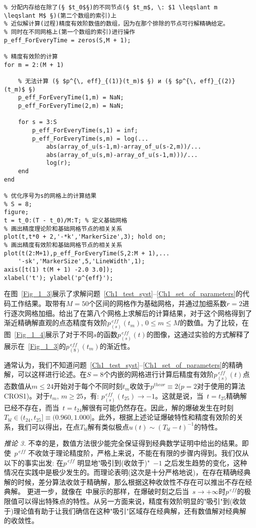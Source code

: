 \documentclass[twoside]{book}
\begin{document}
\begin{CJK*}{GBK}{song}
\begin{lstlisting}
% 分配内存给在除了(§ $t_0$§)的不同节点(§ $t_m$, \: $1 \leqslant m \leqslant M$ §)(第二个数组的索引)上
% 近似解计算(过程)精度有效阶数值的数组，因为在那个排除的节点可行解精确给定。
% 同时在不同网格上(第一个数组的索引)进行操作
p_eff_ForEveryTime = zeros(S,M + 1);

% 精度有效阶的计算
for m = 2:(M + 1)

    % 无法计算 (§ $p^{\, eff}_{(1)}(t_m)$ §) и (§ $p^{\, eff}_{(2)}(t_m)$ §)
    p_eff_ForEveryTime(1,m) = NaN;
    p_eff_ForEveryTime(2,m) = NaN;

    for s = 3:S
        p_eff_ForEveryTime(s,1) = inf;
        p_eff_ForEveryTime(s,m) = log(...
            abs(array_of_u(s-1,m)-array_of_u(s-2,m))/...
            abs(array_of_u(s,m)-array_of_u(s-1,m)))/...
            log(r);
    end
end

% 优化序号为s的网格上的计算结果
% S = 8;
figure;
t = t_0:(T - t_0)/M:T; % 定义基础网格
% 画出精度理论阶和基础网格节点的相关关系
plot(t,t*0 + 2,'-*k','MarkerSize',3); hold on;
% 画出精度有效阶和基础网格节点的相关关系
plot(t(2:M+1),p_eff_ForEveryTime(S,2:M + 1),...
    '-sk','MarkerSize',5,'LineWidth',1);
axis([t(1) t(M + 1) -2.0 3.0]);
xlabel('t'); ylabel('p^{eff}');
\end{lstlisting}


在图~\ref{Fig_1_3}展示了求解问题~\eqref{Ch1_test_syst}--\eqref{Ch1_set_of_parameters}的代码工作结果。取带有$M = 50$个区间的网格作为基础网格，并通过加细系数$r = 2$进行逐次网格加细。给出了在第八个网格上求解后的计算结果，对于这个网格得到了渐近精确解直观的点态精度有效阶$p^{\, eff}_{(s)}(t_m)$, $0 \leqslant m \leqslant M$的数值。为了比较，在图~\ref{Fig_1_4}展示了对于不同$s$的函数$p^{\, eff}_{(s)}(t)$的图像，这通过实验的方式解释了展示在~\ref{Fig_1_3}的$p^{\, eff}_{(8)}(t_m)$的渐近性。

通常认为，我们不知道问题~\eqref{Ch1_test_syst}--\eqref{Ch1_set_of_parameters}的精确解，可以这样进行论述。在$S = 8$个内嵌的网格进行计算后精度有效阶$p^{\, eff}_{(s)}(t)$点态数值从$m\leqslant24$开始对于每个不同时刻$t_m$收敛于$p^{theor} \equiv 2$($p = 2$对于使用的算法CROS1)。对于$t_m$, $m \geqslant 25$，有: $p^{\, eff}_{(s)}(t_{25}) \to -1$。这就是说，当~$t=t_{25}$精确解已经不存在，而当~$t=t_{24}$解很有可能仍然存在。因此，解的爆破发生在时刻~$T_{bl} \in (t_{24},t_{25}] \equiv (0.960,1.000]$。此外，根据上述论证爆破特性和精度有效阶的关系，我们可以得出，在点$T_{bl}$解有类似极点$u(t) \sim (T_{bl} - t)^{-1}$的特性。

\emph{推论 3.} 不幸的是，数值方法很少能完全保证得到经典数学证明中给出的结果。即使~$p^{\, eff}$ 不收敛于理论精度阶，严格上来说，不能在有限的步骤内得到。我们仅从以下的事实出发: 在$p^{\, eff}$ 明显地"吸引到(收敛于)"~$-1$ 之后发生趋势的变化，这种情况在实践中是极少发生的。而理论表明(这次是十分严格地说)，在存在精确经典解的时候，差分算法收敛于精确解，那么根据这种收敛性不存在可以推出不存在经典解。 更进一步，就像在~\cite{BUE_basic_1}中展示的那样，在爆破时刻之后当~$s\to+\infty$时$p^{\, eff}$的极限值可以得出特殊点的特性。从另一方面来说，精度有效阶明显的"吸引"到(收敛于)理论值有助于让我们确信在这种"吸引"区域存在经典解，还有数值解对经典解的收敛性。


\end{CJK*}
\end{document}
